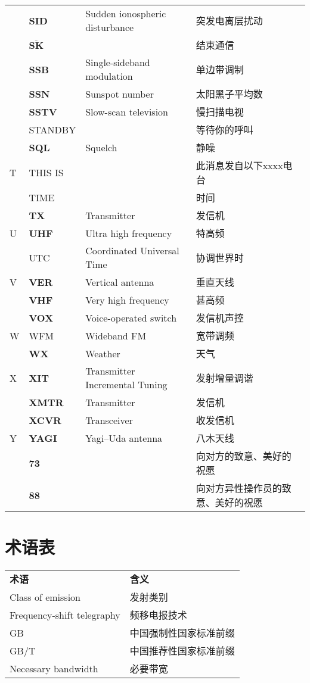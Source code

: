 \begin{longtable}[l]{llll}
& \textbf{SID} & Sudden ionospheric disturbance & 突发电离层扰动 \\
& $\overline{\mathbf{S}\mathbf{K}}$ & & 结束通信 \\
& \textbf{SSB} & Single-sideband modulation & 单边带调制 \\
& \textbf{SSN} & Sunspot number & 太阳黑子平均数 \\
& \textbf{SSTV} & Slow-scan television & 慢扫描电视 \\
& STANDBY & & 等待你的呼叫 \\
& \textbf{SQL} & Squelch & 静噪 \\
T & THIS IS & & 此消息发自以下xxxx电台 \\
& TIME & & 时间 \\
& \textbf{TX} & Transmitter & 发信机 \\
U & \textbf{UHF} & Ultra high frequency & 特高频 \\
& UTC & Coordinated Universal Time & 协调世界时 \\
V & \textbf{VER} & Vertical antenna & 垂直天线 \\
& \textbf{VHF} & Very high frequency & 甚高频 \\
& \textbf{VOX} & Voice-operated switch & 发信机声控 \\
W & WFM & Wideband FM & 宽带调频 \\
& \textbf{WX} & Weather & 天气 \\
X & \textbf{XIT} & Transmitter Incremental Tuning & 发射增量调谐 \\
& \textbf{XMTR} & Transmitter & 发信机 \\
& \textbf{XCVR} & Transceiver & 收发信机 \\
Y & \textbf{YAGI} & Yagi–Uda antenna & 八木天线 \\
& \textbf{73} & & 向对方的致意、美好的祝愿 \\
& \textbf{88} & & 向对方异性操作员的致意、美好的祝愿 \\
\end{longtable}

\newpage



\section{术语表}

\begin{longtable}[l]{ll}
	\textbf{术语} & \textbf{含义} \\
	Class of emission & 发射类别 \\
	Frequency-shift telegraphy & 频移电报技术\\
	GB & 中国强制性国家标准前缀 \\
	GB/T & 中国推荐性国家标准前缀 \\
	Necessary bandwidth & 必要带宽 \\
\end{longtable}

